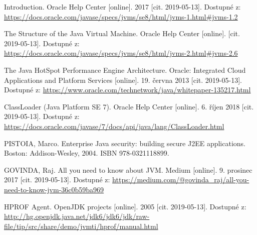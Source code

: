 \begin{literatura}{99}
    Introduction. Oracle Help Center [online]. 2017 [cit. 2019-05-13]. Dostupné z: \url{https://docs.oracle.com/javase/specs/jvms/se8/html/jvms-1.html#jvms-1.2}

    The Structure of the Java Virtual Machine. Oracle Help Center [online]. [cit. 2019-05-13]. Dostupné z: \url{https://docs.oracle.com/javase/specs/jvms/se8/html/jvms-2.html#jvms-2.6}

    The Java HotSpot Performance Engine Architecture. Oracle: Integrated Cloud Applications and Platform Services [online]. 19. června 2013 [cit. 2019-05-13]. Dostupné z: \url{https://www.oracle.com/technetwork/java/whitepaper-135217.html}

    ClassLoader (Java Platform SE 7). Oracle Help Center [online]. 6. říjen 2018 [cit. 2019-05-13]. Dostupné z: \url{https://docs.oracle.com/javase/7/docs/api/java/lang/ClassLoader.html}

    PISTOIA, Marco. Enterprise Java security: building secure J2EE applications. Boston: Addison-Wesley, 2004. ISBN 978-0321118899.

    GOVINDA, Raj. All you need to know about JVM. Medium [online]. 9. prosinec 2017 [cit. 2019-05-13]. Dostupné z: \url{https://medium.com/@govinda_raj/all-you-need-to-know-jvm-36c0b59ba969}

    HPROF Agent. OpenJDK projects [online]. 2005 [cit. 2019-05-13]. Dostupné z: \url{http://hg.openjdk.java.net/jdk6/jdk6/jdk/raw-file/tip/src/share/demo/jvmti/hprof/manual.html}

\end{literatura}
